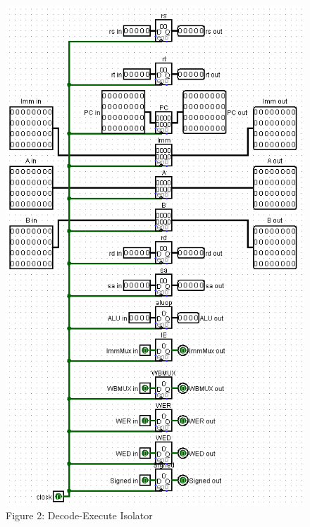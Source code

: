 \documentclass{article}
\begin{document}
\begin{figure}
\vspace{-1.7cm}
\begin{center}
\includegraphics[scale=0.55]{isolator23.png} \\
Figure 2: Decode-Execute Isolator
\end{center}
\vspace{-1.5cm}
\end{figure}
\vspace{-0.7cm}
\end{document}
